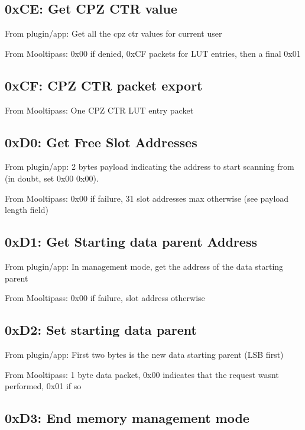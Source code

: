 \subsection*{0x\+CE\+: Get C\+PZ C\+TR value }

From plugin/app\+: Get all the cpz ctr values for current user

From Mooltipass\+: 0x00 if denied, 0x\+CF packets for L\+UT entries, then a final 0x01

\subsection*{0x\+CF\+: C\+PZ C\+TR packet export }

From Mooltipass\+: One C\+PZ C\+TR L\+UT entry packet

\subsection*{0x\+D0\+: Get Free Slot Addresses }

From plugin/app\+: 2 bytes payload indicating the address to start scanning from (in doubt, set 0x00 0x00).

From Mooltipass\+: 0x00 if failure, 31 slot addresses max otherwise (see payload length field)

\subsection*{0x\+D1\+: Get Starting data parent Address }

From plugin/app\+: In management mode, get the address of the data starting parent

From Mooltipass\+: 0x00 if failure, slot address otherwise

\subsection*{0x\+D2\+: Set starting data parent }

From plugin/app\+: First two bytes is the new data starting parent (L\+SB first)

From Mooltipass\+: 1 byte data packet, 0x00 indicates that the request wasn\textquotesingle{}t performed, 0x01 if so

\subsection*{0x\+D3\+: End memory management mode }

